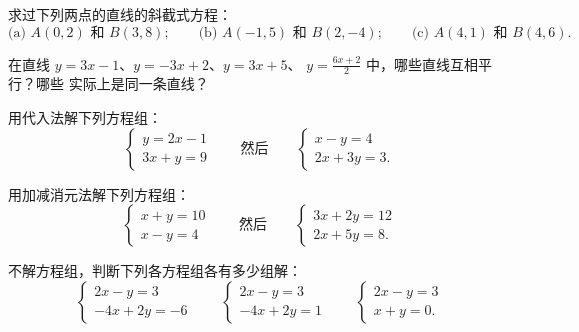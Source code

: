 \begin{exercise}[$\star$]\label{exo:g10:lines:3}
求过下列两点的直线的斜截式方程：
\[
\text{(a) } A(0, 2) \text{ 和 } B(3, 8);
\qquad
\text{(b) } A(-1, 5) \text{ 和 } B(2, -4);
\qquad
\text{(c) } A(4, 1) \text{ 和 } B(4, 6).
\]
\end{exercise}

\begin{exercise}[$\star$]\label{exo:g10:lines:4}
在直线 $y = 3x - 1$、$y = -3x + 2$、$y = 3x + 5$、
$y = \frac{6x + 2}{2}$ 中，哪些直线互相平行？哪些
实际上是同一条直线？
\end{exercise}

\begin{exercise}[$\star$]\label{exo:g10:lines:5}
用代入法解下列方程组：
\[
\begin{cases}
y = 2x - 1 \\
3x + y = 9
\end{cases}
\qquad\text{然后}\qquad
\begin{cases}
x - y = 4 \\
2x + 3y = 3 .
\end{cases}
\]
\end{exercise}

\begin{exercise}[$\star$]\label{exo:g10:lines:6}
用加减消元法解下列方程组：
\[
\begin{cases}
x + y = 10 \\
x - y = 4
\end{cases}
\qquad\text{然后}\qquad
\begin{cases}
3x + 2y = 12 \\
2x + 5y = 8 .
\end{cases}
\]
\end{exercise}

\begin{exercise}[$\star\star$]\label{exo:g10:lines:7}
不解方程组，判断下列各方程组各有多少组解：
\[
\begin{cases}
2x - y = 3 \\
-4x + 2y = -6
\end{cases}
\qquad
\begin{cases}
2x - y = 3 \\
-4x + 2y = 1
\end{cases}
\qquad
\begin{cases}
2x - y = 3 \\
x + y = 0 .
\end{cases}
\]
\end{exercise}

